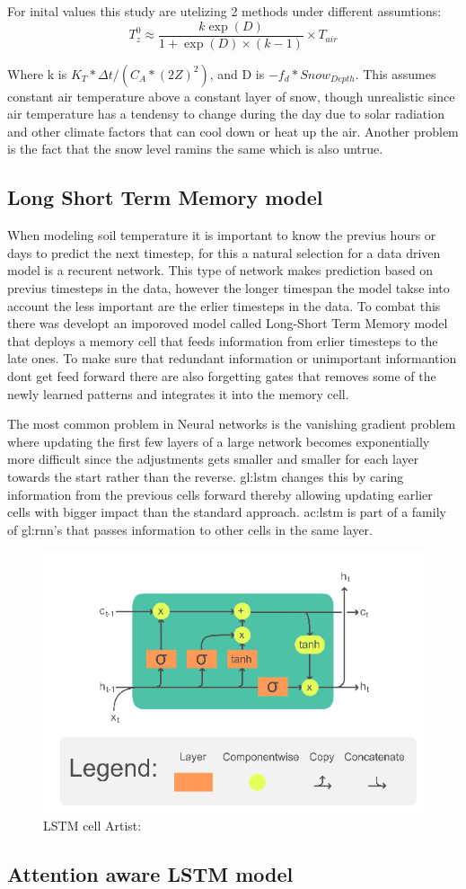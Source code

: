 For inital values this study are utelizing 2 methods under different assumtions:
$$
T_z^0 \approx \frac{k\exp(D)}{1+\exp(D)\times(k-1)}\times T_{air}
$$

Where k is $ K_T*\Delta t/ (C_A * (2Z)^2)$, and D is $-f_d*Snow_{Depth}$. This assumes constant air temperature above a constant layer of snow, though unrealistic since air temperature has a tendensy to change during the day due to solar radiation and other climate factors that can cool down or heat up the air. Another problem is the fact that the snow level ramins the same which is also untrue.

\subsection{Long Short Term Memory model}\label{sec:theory:lstm}
When modeling soil temperature it is important to know the previus hours or days to predict the next timestep, for this a natural selection for a data driven model is a recurent network. This type of network makes prediction based on previus timesteps in the data, however the longer timespan the model takse into account the less important are the erlier timesteps in the data. To combat this there was developt an imporoved model called Long-Short Term Memory model\cite{hochreiter_long_1997} that deploys a memory cell that feeds information from erlier timesteps to the late ones. To make sure that redundant information or unimportant informantion dont get feed forward there are also forgetting gates that removes some of the newly learned patterns and integrates it into the memory cell. 

The most common problem in Neural networks is the vanishing gradient problem where updating the first few layers of a large network becomes exponentially more difficult since the adjustments gets smaller and smaller for each layer towards the start rather than the reverse. \gls{gl:lstm} changes this by caring information from the previous cells forward thereby allowing updating earlier cells with bigger impact than the standard approach\cite{hochreiter_long_1997}. \acrshort{ac:lstm} is part of a family of \gls{gl:rnn}'s that passes information to other cells in the same layer.

\begin{figure}[ht]
	\centering
	\includegraphics[width=0.7\linewidth]{figures/LSTM_Cell}
	\caption{LSTM cell  Artist: \textcite{chevalier_english_2018}}
	\label{fig:lstmcell}
\end{figure}

\subsection[ILSTM]{Attention aware LSTM model}\label{sec:theory:Ilstm}

